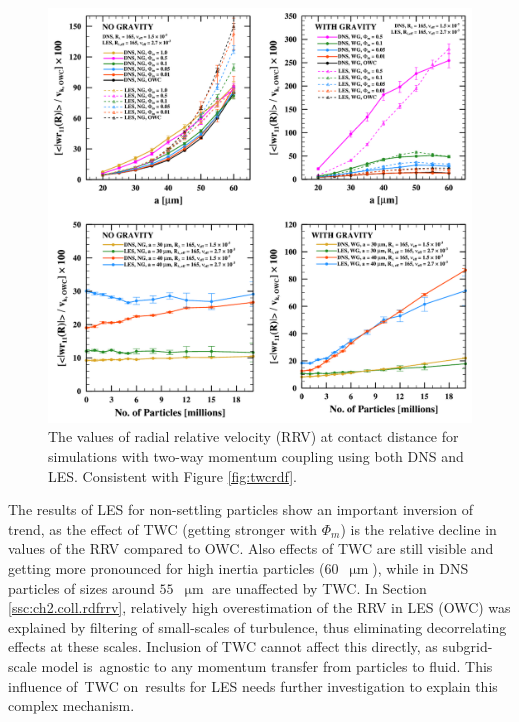 \documentclass{pracamgren}
\begin{document}
\begin{figure}[h]
\centering
\includegraphics[width=13.5cm]{img/plots/2-2-3c-twcrrv.pdf}
\caption{
The values of radial relative velocity (RRV) at contact distance for simulations with two-way momentum coupling using both DNS and LES.
Consistent with Figure \ref{fig:twcrdf}.
}
\label{fig:twcrrv}
\end{figure}

The results of LES for non-settling particles show an important inversion of trend, as the effect of TWC (getting stronger with $\Phi_m$) is the relative decline in values of the RRV compared to OWC.
Also effects of TWC are still visible and getting more pronounced for high inertia particles ($60$~$\upmu\text{m}$), while in DNS particles of sizes around $55$~$\upmu\text{m}$ \parencite[Fig. 22a]{Rosa2020} are unaffected by TWC.
In Section \ref{ssc:ch2.coll.rdfrrv}, relatively high overestimation of the RRV in LES (OWC) was explained by filtering of small-scales of turbulence, thus eliminating decorrelating effects at these scales.
Inclusion of TWC cannot affect this directly, as subgrid-scale model is~agnostic to any momentum transfer from particles to fluid.
This influence of~TWC on~results for LES needs further investigation to explain this complex mechanism.
\end{document}
